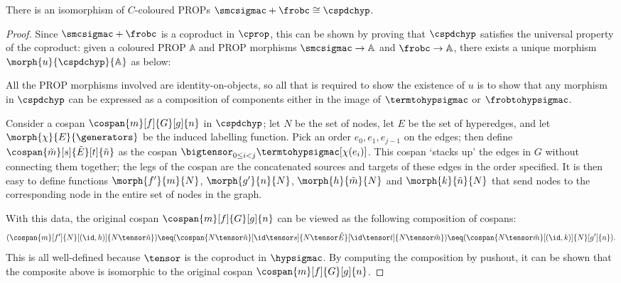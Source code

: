 \begin{theorem}
    \label{thm:isomorphism-smcfrob-cospans}
    There is an isomorphism of \(C\)-coloured PROPs
    \(\smcsigmac + \frobc \cong \cspdchyp\).
\end{theorem}
\begin{proof}
    Since \(\smcsigmac + \frobc\) is a coproduct in \(\cprop\), this can be
    shown by proving that \(\cspdchyp\) satisfies the universal property of the
    coproduct: given a coloured PROP \(\mathbb{A}\) and PROP morphisms
    \(\smcsigmac \to \mathbb{A}\) and \(\frobc \to \mathbb{A}\), there exists
    a unique morphism \(\morph{u}{\cspdchyp}{\mathbb{A}}\) as below:

    \begin{center}
        
    \end{center}

    All the PROP morphisms involved are identity-on-objects, so all that is
    required to show the existence of \(u\) is to show that any morphism in
    \(\cspdchyp\) can be expressed as a composition of components either in the
    image of \(\termtohypsigmac\) or \(\frobtohypsigmac\).

    Consider a cospan \(\cospan{m}[f]{G}[g]{n}\) in \(\cspdchyp\); let \(N\) be
    the set of nodes, let \(E\) be the set of hyperedges, and let
    \(\morph{\chi}{E}{\generators}\) be the induced labelling function.
    Pick an order \(e_0, e_1, e_{j-1}\) on the edges; then define \(
        \cospan{\tilde{m}}[s]{\tilde{E}}[t]{\tilde{n}}
    \) as the cospan \(
        \bigtensor_{0 \leq i < j}
        \termtohypsigmac[\chi(e_i)]
    \).
    This cospan `stacks up' the edges in \(G\) without connecting them together;
    the legs of the cospan are the concatenated sources and targets of these
    edges in the order specified.
    It is then easy to define functions \(\morph{f^\prime}{m}{N}\),
    \(\morph{g^\prime}{n}{N}\), \(\morph{h}{\tilde{m}}{N}\) and
    \(\morph{k}{\tilde{n}}{N}\) that send nodes to the corresponding node in the
    entire set of nodes in the graph.

    With this data, the original cospan \(\cospan{m}[f]{G}[g]{n}\) can be
    viewed as the following composition of cospans: \[
        (
            \cospan{m}[f^\prime]{N}[(\id,h)]{N \tensor \tilde{n}}
        ) \seq (
            \cospan{
                N \tensor \tilde{n}
            }[
                \id \tensor s
            ]{
                N \tensor \tilde{E}
            }[
                \id \tensor t
            ]{
                N \tensor \tilde{m}
            }
        ) \seq (
            \cospan{N \tensor \tilde{m}}[(\id, k)]{N}[g^\prime]{n}
        ).
    \]
    This is all well-defined because \(\tensor\) is the coproduct in
    \(\hypsigmac\).
    By computing the composition by pushout, it can be shown that the composite
    above is isomorphic to the original cospan \(\cospan{m}[f]{G}[g]{n}\).


\end{proof}
